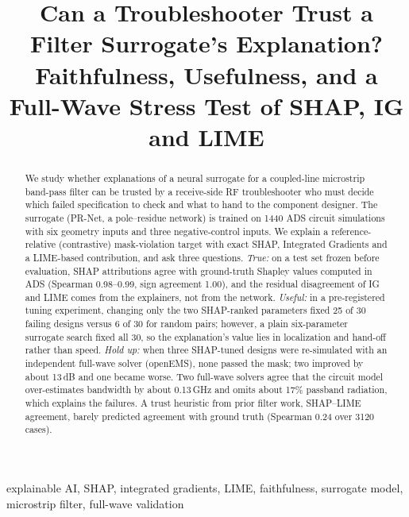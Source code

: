 \documentclass[conference,onecolumn,10pt]{IEEEtran}
\newcommand{\todo}[1]{\textcolor{red}{[TODO: #1]}}
\begin{document}
\title{Can a Troubleshooter Trust a Filter Surrogate's Explanation?\\
Faithfulness, Usefulness, and a Full-Wave Stress Test of SHAP, IG and LIME}

\author{\IEEEauthorblockN{\todo{author names}}
}

\maketitle

\begin{abstract}
We study whether explanations of a neural surrogate for a coupled-line microstrip band-pass filter can be trusted by a receive-side RF troubleshooter who must decide which failed specification to check and what to hand to the component designer.
The surrogate (PR-Net, a pole--residue network) is trained on 1440 ADS circuit simulations with six geometry inputs and three negative-control inputs.
We explain a reference-relative (contrastive) mask-violation target with exact SHAP, Integrated Gradients and a LIME-based contribution, and ask three questions.
\emph{True:} on a test set frozen before evaluation, SHAP attributions agree with ground-truth Shapley values computed in ADS (Spearman 0.98--0.99, sign agreement 1.00), and the residual disagreement of IG and LIME comes from the explainers, not from the network.
\emph{Useful:} in a pre-registered tuning experiment, changing only the two SHAP-ranked parameters fixed 25 of 30 failing designs versus 6 of 30 for random pairs; however, a plain six-parameter surrogate search fixed all 30, so the explanation's value lies in localization and hand-off rather than speed.
\emph{Hold up:} when three SHAP-tuned designs were re-simulated with an independent full-wave solver (openEMS), none passed the mask; two improved by about 13\,dB and one became worse.
Two full-wave solvers agree that the circuit model over-estimates bandwidth by about 0.13\,GHz and omits about 17\% passband radiation, which explains the failures.
A trust heuristic from prior filter work, SHAP--LIME agreement, barely predicted agreement with ground truth (Spearman 0.24 over 3120 cases).
\end{abstract}

\begin{IEEEkeywords}
explainable AI, SHAP, integrated gradients, LIME, faithfulness, surrogate model, microstrip filter, full-wave validation
\end{IEEEkeywords}
\end{document}
